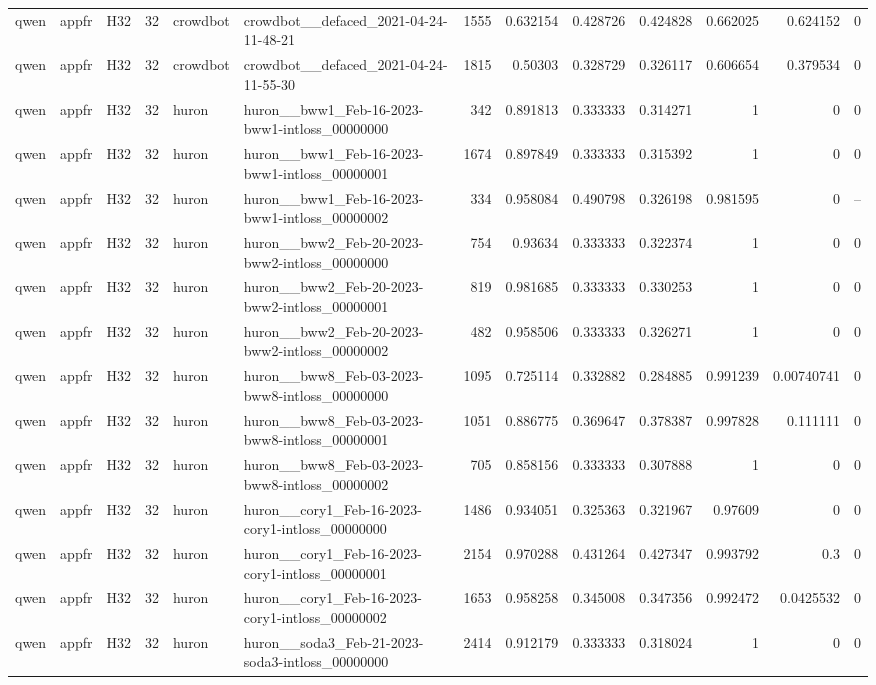 \begin{longtable}{lllrllrrrrrrr}
qwen & appfr & H32 & 32 & crowdbot & crowdbot\_\_defaced\_2021-04-24-11-48-21 & 1555 & 0.632154 & 0.428726 & 0.424828 & 0.662025 & 0.624152 & 0 \\
qwen & appfr & H32 & 32 & crowdbot & crowdbot\_\_defaced\_2021-04-24-11-55-30 & 1815 & 0.50303 & 0.328729 & 0.326117 & 0.606654 & 0.379534 & 0 \\
qwen & appfr & H32 & 32 & huron & huron\_\_bww1\_Feb-16-2023-bww1-intloss\_00000000 & 342 & 0.891813 & 0.333333 & 0.314271 & 1 & 0 & 0 \\
qwen & appfr & H32 & 32 & huron & huron\_\_bww1\_Feb-16-2023-bww1-intloss\_00000001 & 1674 & 0.897849 & 0.333333 & 0.315392 & 1 & 0 & 0 \\
qwen & appfr & H32 & 32 & huron & huron\_\_bww1\_Feb-16-2023-bww1-intloss\_00000002 & 334 & 0.958084 & 0.490798 & 0.326198 & 0.981595 & 0 & -- \\
qwen & appfr & H32 & 32 & huron & huron\_\_bww2\_Feb-20-2023-bww2-intloss\_00000000 & 754 & 0.93634 & 0.333333 & 0.322374 & 1 & 0 & 0 \\
qwen & appfr & H32 & 32 & huron & huron\_\_bww2\_Feb-20-2023-bww2-intloss\_00000001 & 819 & 0.981685 & 0.333333 & 0.330253 & 1 & 0 & 0 \\
qwen & appfr & H32 & 32 & huron & huron\_\_bww2\_Feb-20-2023-bww2-intloss\_00000002 & 482 & 0.958506 & 0.333333 & 0.326271 & 1 & 0 & 0 \\
qwen & appfr & H32 & 32 & huron & huron\_\_bww8\_Feb-03-2023-bww8-intloss\_00000000 & 1095 & 0.725114 & 0.332882 & 0.284885 & 0.991239 & 0.00740741 & 0 \\
qwen & appfr & H32 & 32 & huron & huron\_\_bww8\_Feb-03-2023-bww8-intloss\_00000001 & 1051 & 0.886775 & 0.369647 & 0.378387 & 0.997828 & 0.111111 & 0 \\
qwen & appfr & H32 & 32 & huron & huron\_\_bww8\_Feb-03-2023-bww8-intloss\_00000002 & 705 & 0.858156 & 0.333333 & 0.307888 & 1 & 0 & 0 \\
qwen & appfr & H32 & 32 & huron & huron\_\_cory1\_Feb-16-2023-cory1-intloss\_00000000 & 1486 & 0.934051 & 0.325363 & 0.321967 & 0.97609 & 0 & 0 \\
qwen & appfr & H32 & 32 & huron & huron\_\_cory1\_Feb-16-2023-cory1-intloss\_00000001 & 2154 & 0.970288 & 0.431264 & 0.427347 & 0.993792 & 0.3 & 0 \\
qwen & appfr & H32 & 32 & huron & huron\_\_cory1\_Feb-16-2023-cory1-intloss\_00000002 & 1653 & 0.958258 & 0.345008 & 0.347356 & 0.992472 & 0.0425532 & 0 \\
qwen & appfr & H32 & 32 & huron & huron\_\_soda3\_Feb-21-2023-soda3-intloss\_00000000 & 2414 & 0.912179 & 0.333333 & 0.318024 & 1 & 0 & 0 \\

\end{longtable}
